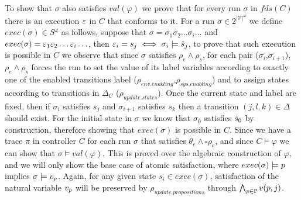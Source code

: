 To show that $\sigma$ also satisfies $val(\varphi)$ we prove that for every run $\sigma$ in $fds(C)$ there is an execution $\varepsilon$ in $C$ that conforms to it.
For a run $\sigma \in 2^{|\mathcal{V}|^{\omega}}$ we define $exec(\sigma) \in S^{\omega}$ as follows, suppose that $\sigma = \sigma_1 \sigma_2 \ldots \sigma_i \ldots$ and
$exec(\sigma)= \varepsilon_1 \varepsilon_2 \ldots \varepsilon_i \ldots$, then $\varepsilon_i = s_j \iff \sigma_i \models \hat{s}_{j}$, to prove that such execution is possible in $C$ we observe that since $\sigma$ satisfies $\rho_e \wedge \rho_s$, for each pair ($\sigma_i$,$\sigma_{i+1}$),  $\rho_e \wedge \rho_s$ forces
the run to set the value of its label variables according to exactly one of the enabled transitions label ($\rho_{env.enabling}$,$\rho_{sys.enabling}$) and to assign states according to transitions in $\Delta_C$ ($\rho_{update.states}$). Once the current state and label are fixed, then if $\sigma_i$ satisfies $s_j$ and $\sigma_{i+1}$ satisfies $s_k$ then a transition $(j, l, k) \in \Delta$ should exist. For the initial state in $\sigma$ we know that $\sigma_0$ satisfies $\hat{s}_{0}$ by construction, therefore showing that $exec(\sigma)$ is possible in $C$.
Since we have a trace $\pi$ in controller $C$ for each run $\sigma$ that satisfies $\theta_e \wedge \square \rho_e$, and since $C \models \varphi$ we can show that $\sigma \models val(\varphi)$. This is proved over the algebraic construction of $\varphi$, and we will only show the base case of atomic satisfaction, where
$exec(\sigma) \models p$ implies $\sigma \models v_{p}$. Again, for any given state $s_i \in exec(\sigma)$, satisfaction of the natural variable $v_{p}$ will be preserved by  $\rho_{update.propositions}$ through $\bigwedge_{p \in \mathbb{P}}v(p,j)$.\\
\\

